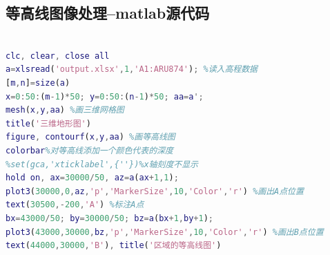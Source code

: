 \documentclass{whutmod}
\begin{document}
\subsection{等高线图像处理--matlab源代码}
\begin{lstlisting}[language=matlab]

clc, clear, close all
a=xlsread('output.xlsx',1,'A1:ARU874'); %读入高程数据
[m,n]=size(a)
x=0:50:(m-1)*50; y=0:50:(n-1)*50; aa=a';
mesh(x,y,aa) %画三维网格图
title('三维地形图')
figure, contourf(x,y,aa) %画等高线图
colorbar%对等高线添加一个颜色代表的深度
%set(gca,'xticklabel',{''})%x轴刻度不显示
hold on, ax=30000/50, az=a(ax+1,1); 
plot3(30000,0,az,'p','MarkerSize',10,'Color','r') %画出A点位置
text(30500,-200,'A') %标注A点
bx=43000/50; by=30000/50; bz=a(bx+1,by+1);
plot3(43000,30000,bz,'p','MarkerSize',10,'Color','r') %画出B点位置
text(44000,30000,'B'), title('区域的等高线图')

\end{lstlisting}
\end{document}
